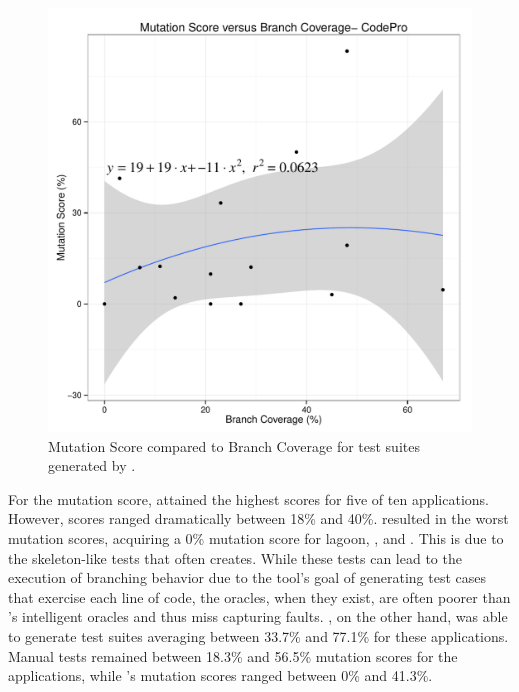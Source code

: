 \begin{figure}[!t]
\centering
  \includegraphics[width=\linewidth]{RGraphs/CodePro_BranchCov_versus_Mutation_poly.pdf}
    \caption{Mutation Score compared to Branch Coverage for test suites generated by \codepro.}
  \label{fig:CP_branch_mutation}
\end{figure}
For the mutation score, \evo attained the highest scores for five of ten applications. However, \diebierse scores ranged dramatically between 18\% and 40\%.  \codepro resulted in the worst mutation scores, acquiring a  0\% mutation score for lagoon, \saxpath, and \xisemele. This is due to the skeleton-like tests that \codepro often creates.  While these tests can lead to the execution of branching behavior due to the tool's goal of generating test cases that exercise each line of code, the oracles, when they exist, are often poorer than \evo's intelligent oracles and thus miss capturing faults. \evo, on the other hand, was able to generate test suites averaging between 33.7\% and 77.1\% for these applications. Manual tests remained between 18.3\% and 56.5\%  mutation scores for the applications, while \codepro's mutation scores ranged between 0\% and 41.3\%. 


